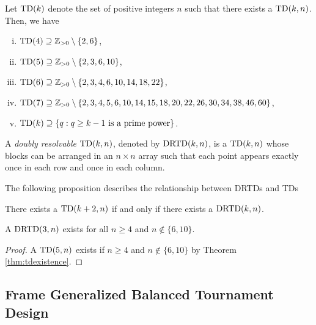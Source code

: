 \documentclass[draft, 11pt]{article}
\begin{document}
\begin{theorem}
\label{thm:tdexistence}
Let ${\rm TD}(k)$ denote the set of positive integers $n$ such that there exists a ${\rm TD}(k,n)$.
Then, we have
\begin{enumerate}[(i)]
\item ${\rm TD}(4)\supseteq\mathbb Z_{>0}\setminus\{2,6\}$,
\item ${\rm TD}(5)\supseteq\mathbb Z_{>0}\setminus\{2,3,6,10\}$,
\item ${\rm TD}(6)\supseteq\mathbb Z_{>0}\setminus\{2,3,4,6,10,14,18,22\}$,
\item ${\rm TD}(7)\supseteq\mathbb Z_{>0}\setminus\{2, 3, 4, 5, 6, 10, 14, 15,18, 20, 22, 26, 30, 34, 38, 46, 60\}$,
\item ${\rm TD}(k)\supseteq\{q:\text{$q\geq k-1$ is a prime power}\}$.
\end{enumerate}
\end{theorem}
 
\begin{definition}
A {\em doubly resolvable} $\textrm{TD}(k,n)$, denoted by $\textrm{DRTD}(k,n)$, is a $\textrm{TD}(k,n)$ whose blocks can
be arranged in an $n\times n$ array such that each point appears exactly once in each row
and once in each column.
\end{definition}
 

The following proposition describes the relationship between DRTDs and TDs

 

 \begin{proposition}
 There exists a $\textrm{TD}(k+2,n)$ if and only if there exists a $\textrm{DRTD}(k,n)$.
 \end{proposition}
 



 \begin{corollary}
 \label{drtdexistence}
 A $\textrm{DRTD}(3,n)$ exists for all $n\geq 4$ and $n\not\in\{6,10\}$.
 \end{corollary}

 \begin{proof}
 A $\textrm{TD}(5,n)$ exists if $n\geq 4$ and $n\not\in\{6,10\}$ by Theorem \ref{thm:tdexistence}.
 \end{proof}




 \subsection{Frame Generalized Balanced Tournament Design}
 \label{sec:fgbtd}
\end{document}
